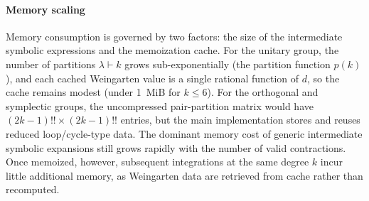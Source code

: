 \documentclass[manuscript,screen]{acmart}
\begin{document}
\paragraph{Memory scaling}
Memory consumption is governed by two factors: the size of the intermediate
symbolic expressions and the memoization cache. For the unitary group, the
number of partitions $\lambda \vdash k$ grows sub-exponentially (the partition
function $p(k)$), and each cached Weingarten value is a single rational function
of $d$, so the cache remains modest (under 1~MiB for $k \le 6$). For the
orthogonal and symplectic groups, the uncompressed pair-partition matrix would
have $(2k{-}1)!! \times (2k{-}1)!!$ entries, but the main implementation stores
and reuses reduced loop/cycle-type data. The dominant memory cost of generic
intermediate symbolic expansions still grows rapidly with the number of valid
contractions. Once memoized, however, subsequent integrations at the same
degree $k$ incur little additional memory, as Weingarten data are retrieved from
cache rather than recomputed.
\end{document}
